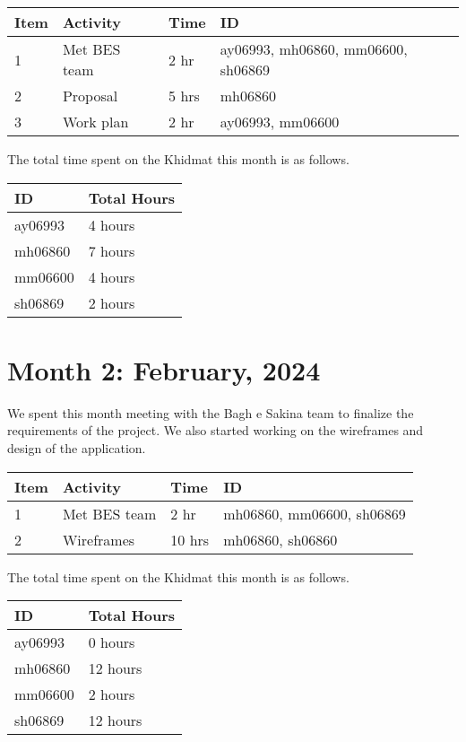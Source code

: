 \documentclass{article}
\begin{document}
\begin{tabular}{|l|l|l|l|}
  \hline
  Item & Activity     & Time  & ID                                 \\\hline\hline
  1    & Met BES team & 2 hr  & ay06993, mh06860, mm06600, sh06869 \\\hline
  2    & Proposal     & 5 hrs & mh06860                            \\\hline
  3    & Work plan    & 2 hr  & ay06993, mm06600                   \\\hline
\end{tabular}

The total time spent on the Khidmat this month is as follows.

\begin{tabular}{|l|l|}
  \hline
  ID      & Total Hours \\\hline\hline
  ay06993 & 4 hours     \\\hline
  mh06860 & 7 hours     \\\hline
  mm06600 & 4 hours     \\\hline
  sh06869 & 2 hours     \\\hline
\end{tabular}

\newpage %
\section*{Month 2: February, 2024}

We spent this month meeting with the Bagh e Sakina team to finalize the
requirements of the project. We also started working on the wireframes and
design of the application.

\begin{tabular}{|l|l|l|l|}
  \hline
  Item & Activity     & Time   & ID                        \\\hline\hline
  1    & Met BES team & 2 hr   & mh06860, mm06600, sh06869 \\\hline
  2    & Wireframes   & 10 hrs & mh06860, sh06860          \\\hline
\end{tabular}

The total time spent on the Khidmat this month is as follows.

\begin{tabular}{|l|l|}
  \hline
  ID      & Total Hours \\\hline\hline
  ay06993 & 0 hours     \\\hline
  mh06860 & 12 hours    \\\hline
  mm06600 & 2 hours     \\\hline
  sh06869 & 12 hours    \\\hline
\end{tabular}
\end{document}
